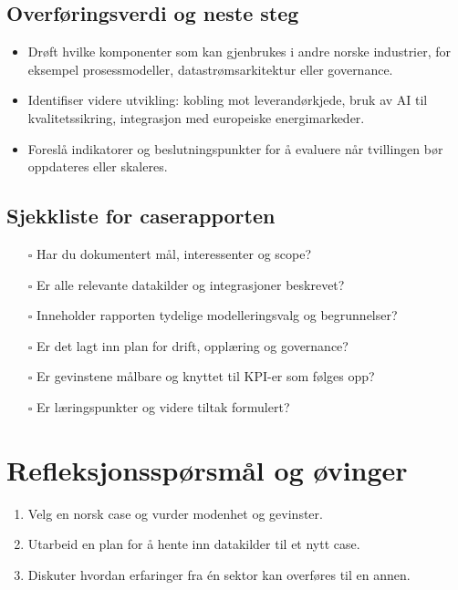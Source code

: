 \subsection{Overføringsverdi og neste steg}
\begin{itemize}
    \item Drøft hvilke komponenter som kan gjenbrukes i andre norske industrier, for eksempel prosessmodeller, datastrømsarkitektur eller governance.
    \item Identifiser videre utvikling: kobling mot leverandørkjede, bruk av AI til kvalitetssikring, integrasjon med europeiske energimarkeder.
    \item Foreslå indikatorer og beslutningspunkter for å evaluere når tvillingen bør oppdateres eller skaleres.
\end{itemize}

\subsection*{Sjekkliste for caserapporten}
\begin{itemize}
    \item[$\square$] Har du dokumentert mål, interessenter og scope?
    \item[$\square$] Er alle relevante datakilder og integrasjoner beskrevet?
    \item[$\square$] Inneholder rapporten tydelige modelleringsvalg og begrunnelser?
    \item[$\square$] Er det lagt inn plan for drift, opplæring og governance?
    \item[$\square$] Er gevinstene målbare og knyttet til KPI-er som følges opp?
    \item[$\square$] Er læringspunkter og videre tiltak formulert?
\end{itemize}

\section{Refleksjonsspørsmål og øvinger}
\begin{enumerate}
    \item Velg en norsk case og vurder modenhet og gevinster.
    \item Utarbeid en plan for å hente inn datakilder til et nytt case.
    \item Diskuter hvordan erfaringer fra én sektor kan overføres til en annen.
\end{enumerate}
